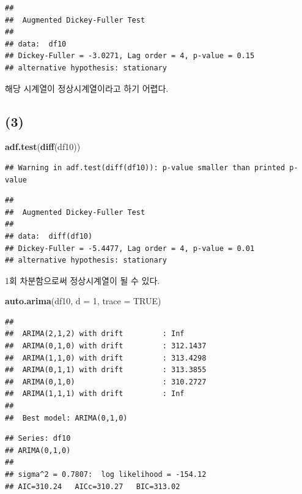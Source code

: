 \documentclass[
]{article}
\newenvironment{Shaded}{\begin{snugshade}}{\end{snugshade}}
\newcommand{\AttributeTok}[1]{\textcolor[rgb]{0.13,0.29,0.53}{#1}}
\newcommand{\ConstantTok}[1]{\textcolor[rgb]{0.56,0.35,0.01}{#1}}
\newcommand{\DecValTok}[1]{\textcolor[rgb]{0.00,0.00,0.81}{#1}}
\newcommand{\FunctionTok}[1]{\textcolor[rgb]{0.13,0.29,0.53}{\textbf{#1}}}
\newcommand{\NormalTok}[1]{#1}
\begin{document}
\begin{verbatim}
## 
##  Augmented Dickey-Fuller Test
## 
## data:  df10
## Dickey-Fuller = -3.0271, Lag order = 4, p-value = 0.15
## alternative hypothesis: stationary
\end{verbatim}

해당 시계열이 정상시계열이라고 하기 어렵다.

\subsection{(3)}\label{section-2}

\begin{Shaded}
\begin{Highlighting}[]
\FunctionTok{adf.test}\NormalTok{(}\FunctionTok{diff}\NormalTok{(df10))}
\end{Highlighting}
\end{Shaded}

\begin{verbatim}
## Warning in adf.test(diff(df10)): p-value smaller than printed p-value
\end{verbatim}

\begin{verbatim}
## 
##  Augmented Dickey-Fuller Test
## 
## data:  diff(df10)
## Dickey-Fuller = -5.4477, Lag order = 4, p-value = 0.01
## alternative hypothesis: stationary
\end{verbatim}

1회 차분함으로써 정상시계열이 될 수 있다.

\begin{Shaded}
\begin{Highlighting}[]
\FunctionTok{auto.arima}\NormalTok{(df10, }\AttributeTok{d =} \DecValTok{1}\NormalTok{, }\AttributeTok{trace =} \ConstantTok{TRUE}\NormalTok{)}
\end{Highlighting}
\end{Shaded}

\begin{verbatim}
## 
##  ARIMA(2,1,2) with drift         : Inf
##  ARIMA(0,1,0) with drift         : 312.1437
##  ARIMA(1,1,0) with drift         : 313.4298
##  ARIMA(0,1,1) with drift         : 313.3855
##  ARIMA(0,1,0)                    : 310.2727
##  ARIMA(1,1,1) with drift         : Inf
## 
##  Best model: ARIMA(0,1,0)
\end{verbatim}

\begin{verbatim}
## Series: df10 
## ARIMA(0,1,0) 
## 
## sigma^2 = 0.7807:  log likelihood = -154.12
## AIC=310.24   AICc=310.27   BIC=313.02
\end{verbatim}
\end{document}
